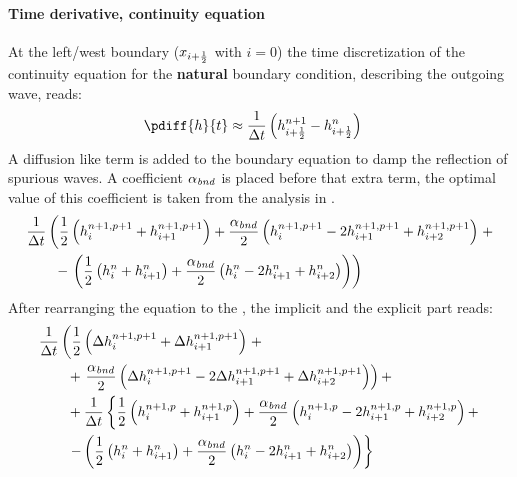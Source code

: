 \paragraph*{Time derivative, continuity equation}
At the left/west boundary ($x_{i+\frac{1}{2}}$ with $i=0$) the time discretization of the continuity equation for the \textbf{natural} boundary condition, describing the outgoing wave, reads:
\begin{align}
    \pdiff{h}{t} & \approx \frac{1}{\Dt} \left(  h^{n+1}_{i+\half} - h^{n}_{i+\half} \right)
\end{align}
A diffusion like term is added to the boundary equation to damp the reflection of spurious waves.
A coefficient $\alpha_{\it bnd}$ is placed before that extra term, the optimal value of this coefficient is taken from the analysis in \citet{transpeq-analysisdiscretizationinsidedomain_boundaries.mw}.
\begin{align}
    & \frac{1}{\Delta t}\left( \frac{1}{2} \left( h^{n+1,p+1}_{i} + h^{n+1,p+1}_{i+1} \right)
    + \frac{\alpha_{\it bnd}}{2} \left( h^{n+1,p+1}_{i} - 2 h^{n+1,p+1}_{i+1} + h^{n+1,p+1}_{i+2}  \right) \right. +
    \nonumber \\*
    & \qquad  - \left. \left(
    \frac{1}{2} \left( h^{n}_{i} + h^{n}_{i+1} \right)
    + \frac{\alpha_{\it bnd}}{2}  \left( h^{n}_{i} - 2 h^{n}_{i+1} + h^{n}_{i+2}  \right) \right)
    \right)
\end{align}
After rearranging the equation to the \deltaformulation, the implicit and the explicit part reads:
\begin{align}
    & \frac{1}{\Delta t}  \left( \frac{1}{2} \left( \Delta h^{n+1, p+1}_{i} + \Delta h^{n+1, p+1}_{i+1} \right) \right. +
    \nonumber \\*
    & \qquad + \left. \frac{\alpha_{\it bnd}}{2}\left( \Delta h^{n+1,p+1}_{i} - 2 \Delta h^{n+1,p+1}_{i+1} + \Delta h^{n+1,p+1}_{i+2} \right) \right) +
    \nonumber \\
    & \qquad + \frac{1}{\Delta t} \left\{ \frac{1}{2} \left( h^{n+1, p}_{i} + h^{n+1, p}_{i+1} \right)
    + \frac{\alpha_{\it bnd}}{2}\left(  h^{n+1,p}_{i} - 2 h^{n+1,p}_{i+1}  + h^{n+1,p}_{i+2} \right) + \right.
    \nonumber \\*
    &
    \qquad \left. - \left( \frac{1}{2} \left( h^{n}_{i} + h^{n}_{i+1} \right)
    + \frac{\alpha_{\it bnd}}{2}  \left( h^{n}_{i} - 2 h^{n}_{i+1} + h^{n}_{i+2}  \right) \right) \right\}
\end{align}
